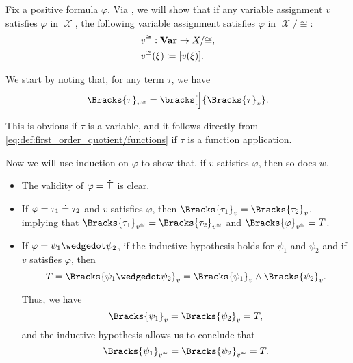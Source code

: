 \begin{defproof}
  Fix a positive formula \( \varphi \). Via , we will show that if any variable assignment \( v \) satisfies \( \varphi \) in \( \mscrX \), the following variable assignment satisfies \( \varphi \) in \( \mscrX / {\cong} \):
  \begin{equation*}
    \begin{aligned}
      &v^{\cong}: \op*{Var} \to X / {\cong}, \\
      &v^{\cong}(\xi) \coloneqq [v(\xi)].
    \end{aligned}
  \end{equation*}

  We start by noting that, for any term \( \tau \), we have
  \begin{equation}\label{eq:thm:quotient_preserves_positive_formulas/term_equality}
    \Bracks{\tau}_{v^{\cong}} = \bracks[\Big]{ \Bracks{\tau}_v }.
  \end{equation}

  This is obvious if \( \tau \) is a variable, and it follows directly from \eqref{eq:def:first_order_quotient/functions} if \( \tau \) is a function application.

  Now we will use induction on \( \varphi \) to show that, if \( v \) satisfies \( \varphi \), then so does \( w \).
  \begin{itemize}
    \item The validity of \( \varphi = \dot\top \) is clear.
    \item If \( \varphi = \tau_1 \doteq \tau_2 \) and \( v \) satisfies \( \varphi \), then \( \Bracks{\tau_1}_v = \Bracks{\tau_2}_v \), implying that \( \Bracks{\tau_1}_{v^{\cong}} = \Bracks{\tau_2}_{v^{\cong}} \) and \( \Bracks{\varphi}_{v^{\cong}} = T \).

    \item If \( \varphi = \psi_1 \synwedge \psi_2 \), if the inductive hypothesis holds for \( \psi_1 \) and \( \psi_2 \) and if \( v \) satisfies \( \varphi \), then
    \begin{equation*}
      T
      =
      \Bracks{\psi_1 \synwedge \psi_2}_v
      =
      \Bracks{\psi_1}_v \wedge \Bracks{\psi_2}_v.
    \end{equation*}

    Thus, we have
    \begin{equation*}
      \Bracks{\psi_1}_v = \Bracks{\psi_2}_v = T,
    \end{equation*}
    and the inductive hypothesis allows us to conclude that
    \begin{equation*}
      \Bracks{\psi_1}_{v^{\cong}} = \Bracks{\psi_2}_{v^{\cong}} = T.
    \end{equation*}


\end{itemize}
\end{defproof}
